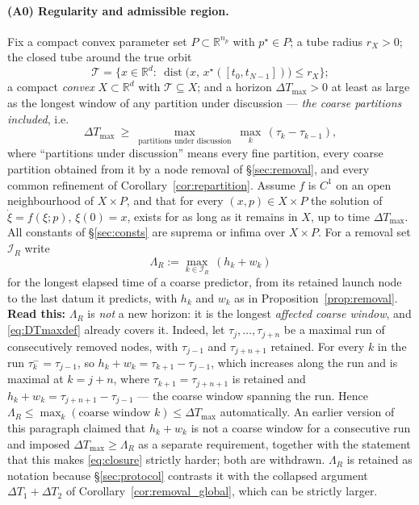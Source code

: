 \documentclass[11pt]{article}
\theoremstyle{remark}\newtheorem{remark}{Remark}
\newcommand{\pstar}{p^\star}
\newcommand{\readthis}[1]{\textbf{Read this:} #1}
\begin{document}
\paragraph{(A0) Regularity and admissible region.}
Fix a compact convex parameter set $P\subset\mathbb R^{n_p}$ with $\pstar\in P$; a tube radius $r_X>0$; the closed tube around the true orbit
\begin{equation}
\mathcal T=\big\{x\in\mathbb R^{d}:\ \operatorname{dist}\big(x,\,x^\star([t_0,t_{N-1}])\big)\le r_X\big\};
\label{eq:tube}
\end{equation}
a compact \emph{convex} $X\subset\mathbb R^{d}$ with $\mathcal T\subseteq X$; and a horizon $\Delta T_{\max}>0$ at least as large as the longest window of any partition under discussion --- \emph{the coarse partitions included}, i.e.
\begin{equation}
\Delta T_{\max}\ \ge\ \max_{\text{partitions under discussion}}\ \max_k\,(\tau_k-\tau_{k-1}),
\label{eq:DTmaxdef}
\end{equation}
where ``partitions under discussion'' means every fine partition, every coarse partition obtained from it by a node removal of \S\ref{sec:removal}, and every common refinement of Corollary~\ref{cor:repartition}. Assume $f$ is $C^1$ on an open neighbourhood of $X\times P$, and that for every $(x,p)\in X\times P$ the solution of $\dot\xi=f(\xi;p)$, $\xi(0)=x$, exists for as long as it remains in $X$, up to time $\Delta T_{\max}$. All constants of \S\ref{sec:consts} are suprema or infima over $X\times P$. For a removal set $\mathcal I_R$ write
\begin{equation}
\Lambda_R:=\max_{k\in\mathcal I_R}\,(h_k+w_k)
\label{eq:LambdaR}
\end{equation}
for the longest elapsed time of a coarse predictor, from its retained launch node to the last datum it predicts, with $h_k$ and $w_k$ as in Proposition~\ref{prop:removal}.
\readthis{$\Lambda_R$ is \emph{not} a new horizon: it is the longest \emph{affected coarse window}, and \eqref{eq:DTmaxdef} already covers it. Indeed, let $\tau_j,\dots,\tau_{j+n}$ be a maximal run of consecutively removed nodes, with $\tau_{j-1}$ and $\tau_{j+n+1}$ retained. For every $k$ in the run $\tau_k^{-}=\tau_{j-1}$, so $h_k+w_k=\tau_{k+1}-\tau_{j-1}$, which increases along the run and is maximal at $k=j+n$, where $\tau_{k+1}=\tau_{j+n+1}$ is retained and $h_k+w_k=\tau_{j+n+1}-\tau_{j-1}$ --- the coarse window spanning the run. Hence $\Lambda_R\le\max_k(\text{coarse window }k)\le\Delta T_{\max}$ automatically. An earlier version of this paragraph claimed that $h_k+w_k$ is not a coarse window for a consecutive run and imposed $\Delta T_{\max}\ge\Lambda_R$ as a separate requirement, together with the statement that this makes \eqref{eq:closure} strictly harder; both are withdrawn. $\Lambda_R$ is retained as notation because \S\ref{sec:protocol} contrasts it with the collapsed argument $\Delta T_1+\Delta T_2$ of Corollary~\ref{cor:removal_global}, which can be strictly larger.}
\end{document}

